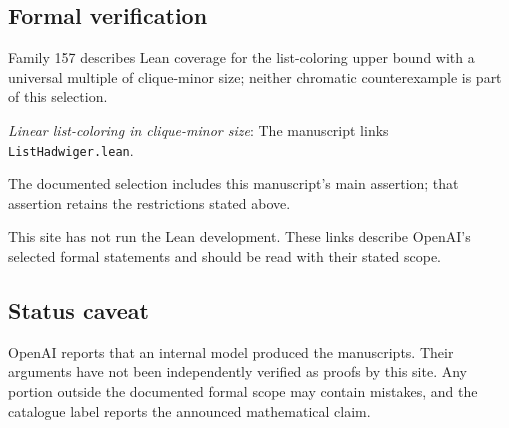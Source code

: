 \documentclass[11pt]{article}
\begin{document}
\subsection{Formal verification}
Family 157 describes Lean coverage for the list-coloring upper bound with a universal multiple of clique-minor size; neither chromatic counterexample is part of this selection.

\textit{Linear list-coloring in clique-minor size}: The manuscript links \texttt{ListHadwiger.lean}.

The documented selection includes this manuscript’s main assertion; that assertion retains the restrictions stated above.

This site has not run the Lean development. These links describe OpenAI’s selected formal statements and should be read with their stated scope.

\subsection{Status caveat}
OpenAI reports that an internal model produced the manuscripts. Their arguments have not been independently verified as proofs by this site. Any portion outside the documented formal scope may contain mistakes, and the catalogue label reports the announced mathematical claim.
\end{document}
